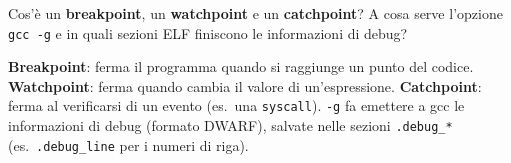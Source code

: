 \question[4]
Cos'è un \textbf{breakpoint}, un \textbf{watchpoint} e un \textbf{catchpoint}?
A cosa serve l'opzione \lstinline|gcc -g| e in quali sezioni ELF finiscono le informazioni di debug?
\begin{solution}
\textbf{Breakpoint}: ferma il programma quando si raggiunge un punto del codice. \textbf{Watchpoint}: ferma quando cambia il valore di un'espressione. \textbf{Catchpoint}: ferma al verificarsi di un evento (es.\ una \lstinline|syscall|).
\lstinline|-g| fa emettere a gcc le informazioni di debug (formato DWARF), salvate nelle sezioni \lstinline|.debug_*| (es.\ \lstinline|.debug_line| per i numeri di riga).
\end{solution}

